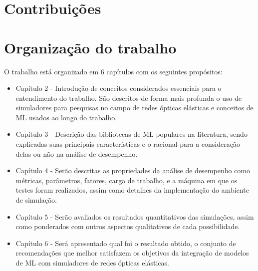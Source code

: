 \section{Contribuições}
\label{intro-contributions}



\section{Organização do trabalho}
\label{intro-org}

O trabalho está organizado em 6 capítulos com os seguintes propósitos:

\begin{itemize}
  \item Capítulo 2 - Introdução de conceitos considerados essenciais para o entendimento do trabalho. São descritos de forma mais profunda o uso de simuladores para pesquisas no campo de redes ópticas elásticas e conceitos de ML usados ao longo do trabalho.

  \item Capítulo 3 - Descrição das bibliotecas de ML populares na literatura, sendo explicadas suas principais características e o racional para a consideração delas ou não na análise de desempenho.

  \item Capítulo 4 - Serão descritas as propriedades da análise de desempenho como métricas, parâmetros, fatores, carga de trabalho, e a máquina em que os testes foram realizados, assim como detalhes da implementação do ambiente de simulação.

  \item Capítulo 5 - Serão avaliados os resultados quantitativos das simulações, assim como ponderados com outros aspectos qualitativos de cada possibilidade.

  \item Capítulo 6 - Será apresentado qual foi o resultado obtido, o conjunto de recomendações que melhor satisfazem os objetivos da integração de modelos de ML com simuladores de redes ópticas elásticas.
\end{itemize}
